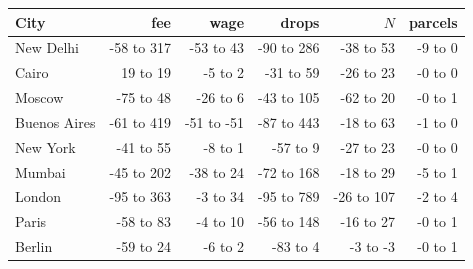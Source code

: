 \begin{tabular}{lrrrrr}
\toprule
City & fee & wage & drops & $N$ & parcels \\
\midrule
New Delhi & -58 to 317 & -53 to 43 & -90 to 286 & -38 to 53 & -9 to 0 \\
Cairo & 19 to 19 & -5 to 2 & -31 to 59 & -26 to 23 & -0 to 0 \\
Moscow & -75 to 48 & -26 to 6 & -43 to 105 & -62 to 20 & -0 to 1 \\
Buenos Aires & -61 to 419 & -51 to -51 & -87 to 443 & -18 to 63 & -1 to 0 \\
New York & -41 to 55 & -8 to 1 & -57 to 9 & -27 to 23 & -0 to 0 \\
Mumbai & -45 to 202 & -38 to 24 & -72 to 168 & -18 to 29 & -5 to 1 \\
London & -95 to 363 & -3 to 34 & -95 to 789 & -26 to 107 & -2 to 4 \\
Paris & -58 to 83 & -4 to 10 & -56 to 148 & -16 to 27 & -0 to 1 \\
Berlin & -59 to 24 & -6 to 2 & -83 to 4 & -3 to -3 & -0 to 1 \\
\bottomrule
\end{tabular}
